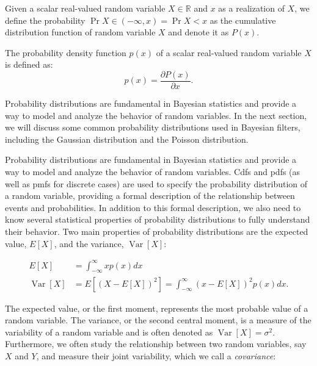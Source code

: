 \begin{definition}
    Given a scalar real-valued random variable $X \in \mathbb{R}$ and $x$ as a
    realization of $X$, we define the probability $\Pr{X \in (-\infty, x)} = \Pr{X < x}$
    as the cumulative distribution function of random variable $X$ and denote it as $P(x)$.
\end{definition}

\begin{definition}
    The probability density function $p(x)$ of a scalar real-valued random variable $X$
    is defined as:
    $$
    p(x) = \frac{\partial P(x)}{\partial x}.
    $$
\end{definition}

Probability distributions are fundamental in Bayesian statistics and provide a way
to model and analyze the behavior of random variables. In the next section,
we will discuss some common probability distributions used in Bayesian filters,
including the Gaussian distribution and the Poisson distribution.

Probability distributions are fundamental in Bayesian statistics and provide a way
to model and analyze the behavior of random variables. Cdfs and pdfs (as well as pmfs
for discrete cases) are used to specify the probability distribution of a random
variable, providing a formal description of the relationship
between events and probabilities. In addition to this formal description, we also
need to know several statistical properties of probability distributions to fully
understand their behavior. Two main properties of probability distributions are
the expected value, $E[X]$, and the variance, $\operatorname{Var}[X]$:

$$
\begin{aligned}
E[X]&=\int_{-\infty}^{\infty} x p(x) d x \\
\operatorname{Var}[X]
    &= E\left[(X-E[X])^2\right]
    =\int_{-\infty}^{\infty}(x-E[X])^2 p(x) d x.
\end{aligned}
$$

The expected value, or the first moment, represents the most probable value of
a random variable. The variance, or the second central moment, is a measure of the
variability of a random variable and is often denoted as $\operatorname{Var}[X] = \sigma^2$.
Furthermore, we often study the relationship between two random variables, say $X$ and
$Y$, and measure their joint variability, which we call a \textit{covariance}:

